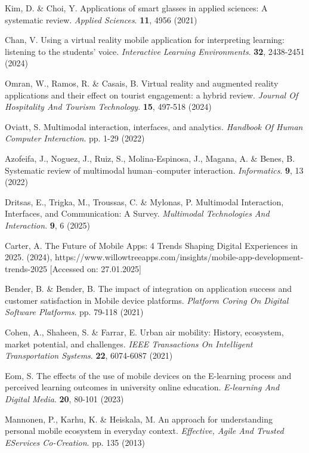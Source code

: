 \documentclass[preprint,12pt,number]{elsarticle}
\begin{document}
\begin{thebibliography}{00}
Kim, D. \& Choi, Y. Applications of smart glasses in applied sciences: A systematic review. {\em Applied Sciences}. \textbf{11}, 4956 (2021)

Chan, V. Using a virtual reality mobile application for interpreting learning: listening to the students’ voice. {\em Interactive Learning Environments}. \textbf{32}, 2438-2451 (2024)

Omran, W., Ramos, R. \& Casais, B. Virtual reality and augmented reality applications and their effect on tourist engagement: a hybrid review. {\em Journal Of Hospitality And Tourism Technology}. \textbf{15}, 497-518 (2024)

Oviatt, S. Multimodal interaction, interfaces, and analytics. {\em Handbook Of Human Computer Interaction}. pp. 1-29 (2022)

Azofeifa, J., Noguez, J., Ruiz, S., Molina-Espinosa, J., Magana, A. \& Benes, B. Systematic review of multimodal human–computer interaction. {\em Informatics}. \textbf{9}, 13 (2022)

Dritsas, E., Trigka, M., Troussas, C. \& Mylonas, P. Multimodal Interaction, Interfaces, and Communication: A Survey. {\em Multimodal Technologies And Interaction}. \textbf{9}, 6 (2025)

Carter, A. The Future of Mobile Apps: 4 Trends Shaping Digital Experiences in 2025.  (2024), https://www.willowtreeapps.com/insights/mobile-app-development-trends-2025 [Accessed on: 27.01.2025]

Bender, B. \& Bender, B. The impact of integration on application success and customer satisfaction in Mobile device platforms. {\em Platform Coring On Digital Software Platforms}. pp. 79-118 (2021)

Cohen, A., Shaheen, S. \& Farrar, E. Urban air mobility: History, ecosystem, market potential, and challenges. {\em IEEE Transactions On Intelligent Transportation Systems}. \textbf{22}, 6074-6087 (2021)

Eom, S. The effects of the use of mobile devices on the E-learning process and perceived learning outcomes in university online education. {\em E-learning And Digital Media}. \textbf{20}, 80-101 (2023)

Mannonen, P., Karhu, K. \& Heiskala, M. An approach for understanding personal mobile ecosystem in everyday context. {\em Effective, Agile And Trusted EServices Co-Creation}. pp. 135 (2013)


\end{thebibliography}
\end{document}
